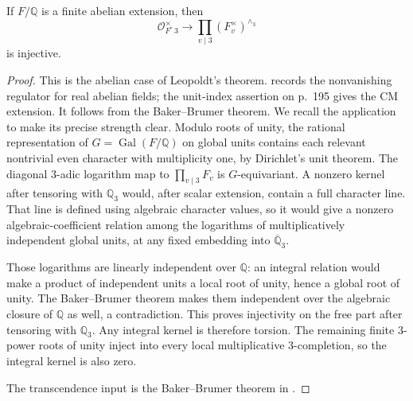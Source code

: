 \begin{lemma}
\label{lem:lm-abelian-leopoldt}
If $F/\mathbb Q$ is a finite abelian extension, then
\[
 \mathcal O_F^\times\widehat{\ }_3
 \longrightarrow
 \prod_{v\mid3}(F_v^\times)^{\wedge_3}
\]
is injective.
\end{lemma}
\begin{proof}
This is the abelian case of Leopoldt's theorem.
\citet[pp.~192--193, Remark~1 after Theorem~$1_p$]{Brumer1968}
records the nonvanishing regulator for real abelian fields;
the unit-index assertion on p.~195 gives the CM extension.
It follows from the Baker--Brumer theorem.  We recall the application
to make its precise strength clear.  Modulo roots of unity,
the rational representation of
$G=\operatorname{Gal}(F/\mathbb Q)$ on global units contains
each relevant nontrivial even character with multiplicity
one, by Dirichlet's unit theorem.  The diagonal $3$-adic
logarithm map to $\prod_{v\mid3}F_v$ is $G$-equivariant.
A nonzero kernel after tensoring with $\mathbb Q_3$ would,
after scalar extension, contain a full character line.
That line is defined using algebraic character values,
so it would give a nonzero algebraic-coefficient relation
among the logarithms of multiplicatively independent
global units, at any fixed embedding into
$\overline{\mathbb Q}_3$.

Those logarithms are linearly independent over $\mathbb Q$:
an integral relation would make a product of independent
units a local root of unity, hence a global root of unity.
The Baker--Brumer theorem makes them independent over the
algebraic closure of $\mathbb Q$ as well, a contradiction.
This proves injectivity on the free part after tensoring
with $\mathbb Q_3$.  Any integral kernel is therefore
torsion.  The remaining finite $3$-power roots of unity
inject into every local multiplicative $3$-completion,
so the integral kernel is also zero.

The transcendence input is the Baker--Brumer theorem in
\citet[Theorem, p.~11-01; proof, pp.~11-02--11-08]{Rousseau1969}.
\end{proof}

